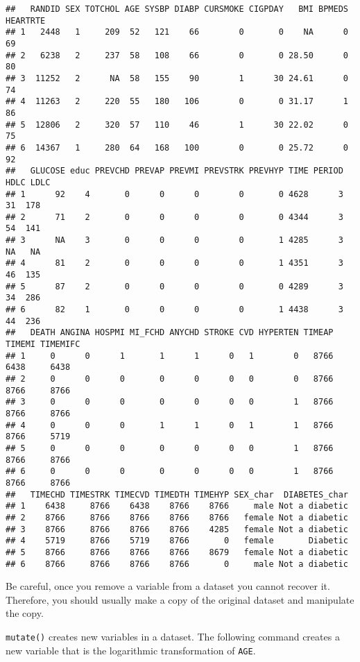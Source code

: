 \documentclass[
]{article}
\begin{document}
\begin{verbatim}
##   RANDID SEX TOTCHOL AGE SYSBP DIABP CURSMOKE CIGPDAY   BMI BPMEDS HEARTRTE
## 1   2448   1     209  52   121    66        0       0    NA      0       69
## 2   6238   2     237  58   108    66        0       0 28.50      0       80
## 3  11252   2      NA  58   155    90        1      30 24.61      0       74
## 4  11263   2     220  55   180   106        0       0 31.17      1       86
## 5  12806   2     320  57   110    46        1      30 22.02      0       75
## 6  14367   1     280  64   168   100        0       0 25.72      0       92
##   GLUCOSE educ PREVCHD PREVAP PREVMI PREVSTRK PREVHYP TIME PERIOD HDLC LDLC
## 1      92    4       0      0      0        0       0 4628      3   31  178
## 2      71    2       0      0      0        0       0 4344      3   54  141
## 3      NA    3       0      0      0        0       1 4285      3   NA   NA
## 4      81    2       0      0      0        0       1 4351      3   46  135
## 5      87    2       0      0      0        0       0 4289      3   34  286
## 6      82    1       0      0      0        0       1 4438      3   44  236
##   DEATH ANGINA HOSPMI MI_FCHD ANYCHD STROKE CVD HYPERTEN TIMEAP TIMEMI TIMEMIFC
## 1     0      0      1       1      1      0   1        0   8766   6438     6438
## 2     0      0      0       0      0      0   0        0   8766   8766     8766
## 3     0      0      0       0      0      0   0        1   8766   8766     8766
## 4     0      0      0       1      1      0   1        1   8766   8766     5719
## 5     0      0      0       0      0      0   0        1   8766   8766     8766
## 6     0      0      0       0      0      0   0        1   8766   8766     8766
##   TIMECHD TIMESTRK TIMECVD TIMEDTH TIMEHYP SEX_char  DIABETES_char
## 1    6438     8766    6438    8766    8766     male Not a diabetic
## 2    8766     8766    8766    8766    8766   female Not a diabetic
## 3    8766     8766    8766    8766    4285   female Not a diabetic
## 4    5719     8766    5719    8766       0   female       Diabetic
## 5    8766     8766    8766    8766    8679   female Not a diabetic
## 6    8766     8766    8766    8766       0     male Not a diabetic
\end{verbatim}

Be careful, once you remove a variable from a dataset you cannot recover
it. Therefore, you should usually make a copy of the original dataset
and manipulate the copy.

\texttt{mutate()} creates new variables in a dataset. The following
command creates a new variable that is the logarithmic transformation of
\texttt{AGE}.
\end{document}
